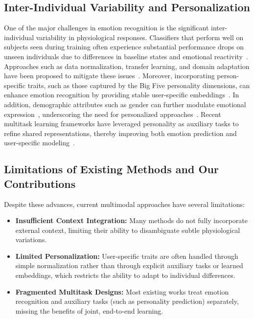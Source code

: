 \documentclass[sigconf]{acmart}
\begin{document}
\subsection*{Inter-Individual Variability and Personalization}

One of the major challenges in emotion recognition is the significant inter-individual variability in physiological responses. Classifiers that perform well on subjects seen during training often experience substantial performance drops on unseen individuals due to differences in baseline states and emotional reactivity~\cite{Li2018}. Approaches such as data normalization, transfer learning, and domain adaptation have been proposed to mitigate these issues~\cite{Chai2017}. Moreover, incorporating person-specific traits, such as those captured by the Big Five personality dimensions, can enhance emotion recognition by providing stable user-specific embeddings~\cite{Subramanian2016,Zhao2018,Tian2021,Filippou2023,Kashani2023}. In addition, demographic attributes such as gender can further modulate emotional expression~\cite{Yildirim2023}, underscoring the need for personalized approaches~\cite{Yu2021}. Recent multitask learning frameworks have leveraged personality as auxiliary tasks to refine shared representations, thereby improving both emotion prediction and user-specific modeling~\cite{EmotionPersonalityDetection,AuxiliaryTasksEmotion,Henderson2021,Benouis2023}.

\subsection*{Limitations of Existing Methods and Our Contributions}

Despite these advances, current multimodal approaches have several limitations:
\begin{itemize}
    \item \textbf{Insufficient Context Integration:} Many methods do not fully incorporate external context, limiting their ability to disambiguate subtle physiological variations.
    \item \textbf{Limited Personalization:} User-specific traits are often handled through simple normalization rather than through explicit auxiliary tasks or learned embeddings, which restricts the ability to adapt to individual differences.
    \item \textbf{Fragmented Multitask Designs:} Most existing works treat emotion recognition and auxiliary tasks (such as personality prediction) separately, missing the benefits of joint, end-to-end learning.
\end{itemize}
\end{document}
